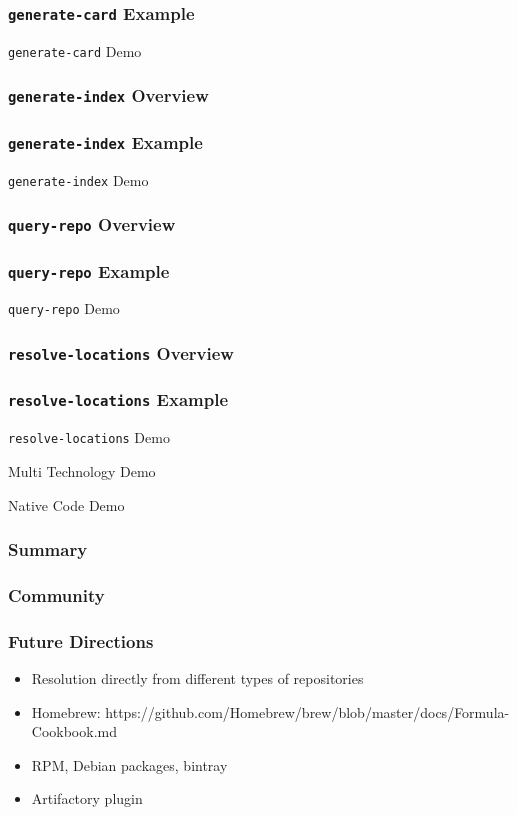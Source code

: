 \documentclass{beamer}
\begin{document}
  \begin{frame}
      \frametitle{\texttt{generate-card} Example}
  \end{frame}
  \begin{frame}
      \centerline{\color{blue}\Large \texttt{generate-card} Demo}
  \end{frame}
  \begin{frame}
      \frametitle{\texttt{generate-index} Overview}
  \end{frame}
  \begin{frame}
      \frametitle{\texttt{generate-index} Example}
  \end{frame}
  \begin{frame}
      \centerline{\color{blue}\Large \texttt{generate-index} Demo}
  \end{frame}
  \begin{frame}
      \frametitle{\texttt{query-repo} Overview}
  \end{frame}
  \begin{frame}
      \frametitle{\texttt{query-repo} Example}
  \end{frame}
  \begin{frame}
      \centerline{\color{blue}\Large \texttt{query-repo} Demo}
  \end{frame}
  \begin{frame}
      \frametitle{\texttt{resolve-locations} Overview}
  \end{frame}
  \begin{frame}
      \frametitle{\texttt{resolve-locations} Example}
  \end{frame}
  \begin{frame}
      \centerline{\color{blue}\Large \texttt{resolve-locations} Demo}
  \end{frame}
  \begin{frame}
      \centerline{\color{blue}\Large Multi Technology Demo}
  \end{frame}
  \begin{frame}
      \centerline{\color{blue}\Large Native Code Demo}
  \end{frame}
  \begin{frame}
      \frametitle{Summary}
  \end{frame}
  \begin{frame}
      \frametitle{Community}
  \end{frame}
  \begin{frame}
      \frametitle{Future Directions}
      \begin{itemize}
          \item Resolution directly from different types of repositories
          \item Homebrew: https://github.com/Homebrew/brew/blob/master/docs/Formula-Cookbook.md
          \item RPM, Debian packages, bintray
          \item Artifactory plugin
      \end{itemize}
  \end{frame}
\end{document}
